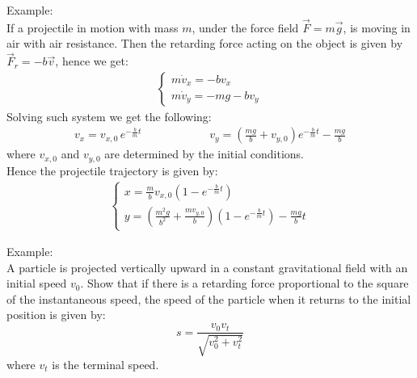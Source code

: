 \documentclass[11pt,oneside]{book}
\theoremstyle{break}
\theoremstyle{break}
\newcommand{\example}{\color{green}Example: \color{black}}
\begin{document}
\example\\
If a projectile in motion with mass $m$, under the force field $\vec{F} = m \vec{g}$, is moving in air with air resistance. Then the retarding force acting on the object is given by $\vec{F}_r = -b\vec{v}$, hence we get:
\begin{align*}
\begin{cases}
m\dot{v}_x = -b v_x \\
m\dot{v}_y = -mg -bv_y
\end{cases}
\end{align*}
Solving such system we get the following:
\begin{align*}
v_x = v_{x,0} \, e^{-\frac{b}{m}t}\qquad\qquad\qquad v_y = \left( \frac{mg}{b}+v_{y,0} \right) e^{-\frac{b}{m}t} - \frac{mg}{b}
\end{align*}
where $v_{x,0}$ and $v_{y,0}$ are determined by the initial conditions. \\Hence the projectile trajectory is given by:
\begin{align*}
\begin{cases}
x = \frac{m}{b}v_{x,0}\left(1-e^{-\frac{b}{m}t}\right)\\
y = \left(\frac{m^2 g}{b^2}+\frac{mv_{y,0}}{b} \right)\left(1-e^{-\frac{b}{m}t}\right)-\frac{mg}{b}t
\end{cases}
\end{align*}

\newpage
\example\\
A particle is projected vertically upward in a constant gravitational field with an initial speed $v_0$. Show that if there is a retarding force proportional to the square of the instantaneous speed, the speed of the particle when it returns to the initial position is given by:
$$s = \frac{v_0 v_t}{\sqrt{v_0^2 + v_t^2}}$$
where $v_t$ is the terminal speed.\\
\end{document}
